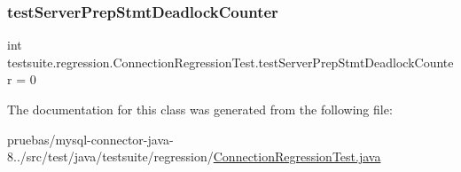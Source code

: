 \subsubsection{\texorpdfstring{test\+Server\+Prep\+Stmt\+Deadlock\+Counter}{testServerPrepStmtDeadlockCounter}}
{\footnotesize\ttfamily int testsuite.\+regression.\+Connection\+Regression\+Test.\+test\+Server\+Prep\+Stmt\+Deadlock\+Counter = 0\hspace{0.3cm}{\ttfamily [protected]}}



The documentation for this class was generated from the following file\+:\begin{DoxyCompactItemize}
\item 
pruebas/mysql-\/connector-\/java-\/8../src/test/java/testsuite/regression/\mbox{\hyperlink{_connection_regression_test_8java}{Connection\+Regression\+Test.\+java}}\end{DoxyCompactItemize}
